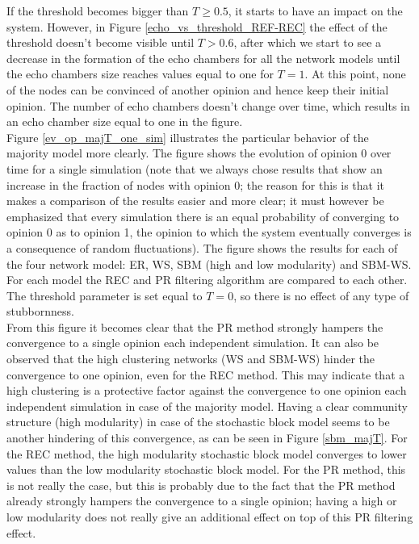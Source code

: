 \documentclass[11 pt , letterpaper , twoside , openright]{book}
\begin{document}
If the threshold becomes bigger than $T \geqslant 0.5$, it starts to have an impact on the system. However, in Figure \ref{echo_vs_threshold_REF-REC} the effect of the threshold doesn't become visible until $T > 0.6$, after which we start to see a decrease in the formation of the echo chambers for all the network models until the echo chambers size reaches values equal to one for $T=1$. At this point, none of the nodes can be convinced of another opinion and hence keep their initial opinion. The number of echo chambers doesn't change over time, which results in an echo chamber size equal to one in the figure.\\
\newline
Figure \ref{ev_op_majT_one_sim} illustrates the particular behavior of the majority model more clearly. The figure shows the evolution of opinion 0 over time for a single simulation (note that we always chose results that show an increase in the fraction of nodes with opinion 0; the reason for this is that it makes a comparison of the results easier and more clear; it must however be emphasized that every simulation there is an equal probability of converging to opinion 0 as to opinion 1, the opinion to which the system eventually converges is a consequence of random fluctuations). The figure shows the results for each of the four network model: ER, WS, SBM (high and low modularity) and SBM-WS. For each model the REC and PR filtering algorithm are compared to each other. The threshold parameter is set equal to $T=0$, so there is no effect of any type of stubbornness.\\
From this figure it becomes clear that the PR method strongly hampers the convergence to a single opinion each independent simulation. It can also be observed that the high clustering networks (WS and SBM-WS) hinder the convergence to one opinion, even for the REC method. This may indicate that a high clustering is a protective factor against the convergence to one opinion each independent simulation in case of the majority model. Having a clear community structure (high modularity) in case of the stochastic block model seems to be another hindering of this convergence, as can be seen in Figure \ref{sbm_majT}.  For the REC method, the high modularity stochastic block model converges to lower values than the low modularity stochastic block model. For the PR method, this is not really the case, but this is probably due to the fact that the PR method already strongly hampers the convergence to a single opinion; having a high or low modularity does not really give an additional effect on top of this PR filtering effect.
\end{document}
